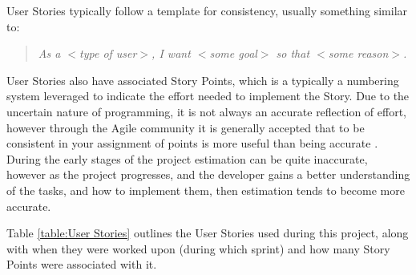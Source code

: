 User Stories typically follow a template for consistency, usually something similar to:

\begin{quotation}
  \textit{As a $<$type of user$>$, I want $<$some goal$>$ so that $<$some reason$>$.} \cite{user_story}
\end{quotation}

User Stories also have associated Story Points, which is a typically a numbering system leveraged to indicate the effort needed to implement the Story. Due to the uncertain nature of programming, it is not always an accurate reflection of effort, however through the Agile community it is generally accepted that to be consistent in your assignment of points is more useful than being accurate \cite{estimation}. During the early stages of the project estimation can be quite inaccurate, however as the project progresses, and the developer gains a better understanding of the tasks, and how to implement them, then estimation tends to become more accurate.

Table \ref{table:User Stories} outlines the User Stories used during this project, along with when they were worked upon (during which sprint) and how many Story Points were associated with it.

